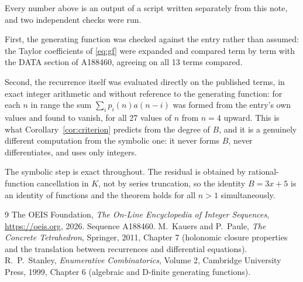 \documentclass[11pt,a4paper]{article}
\theoremstyle{plain}
\theoremstyle{definition}
\begin{document}
Every number above is an output of a script written separately from this note, and two
independent checks were run.

First, the generating function was checked against the entry rather than assumed: the
Taylor coefficients of \eqref{eq:gf} were expanded and compared term by term with the DATA
section of A188460, agreeing on all 13 terms compared.

Second, the recurrence itself was evaluated directly on the published terms, in exact
integer arithmetic and without reference to the generating function: for each $n$ in range
the sum $\sum_{i}p_{i}(n)a(n-i)$ was formed from the entry's own values and found to
vanish, for all 27 values of $n$ from $n=4$ upward. This is what
Corollary~\ref{cor:criterion} predicts from the degree of $B$, and it is a genuinely
different computation from the symbolic one: it never forms $B$, never differentiates, and
uses only integers.

The symbolic step is exact throughout. The residual is obtained by rational-function
cancellation in $K$, not by series truncation, so the identity $B=3 x + 5$ is an
identity of functions and the theorem holds for all $n>1$ simultaneously.

\begin{thebibliography}{9}
 The OEIS Foundation, \emph{The On-Line Encyclopedia of Integer Sequences},
\url{https://oeis.org}, 2026. Sequence A188460.
 M.~Kauers and P.~Paule, \emph{The Concrete Tetrahedron}, Springer, 2011,
Chapter 7 (holonomic closure properties and the translation between recurrences and
differential equations).
 R.~P.~Stanley, \emph{Enumerative Combinatorics}, Volume 2, Cambridge
University Press, 1999, Chapter 6 (algebraic and D-finite generating functions).
\end{thebibliography}
\end{document}
